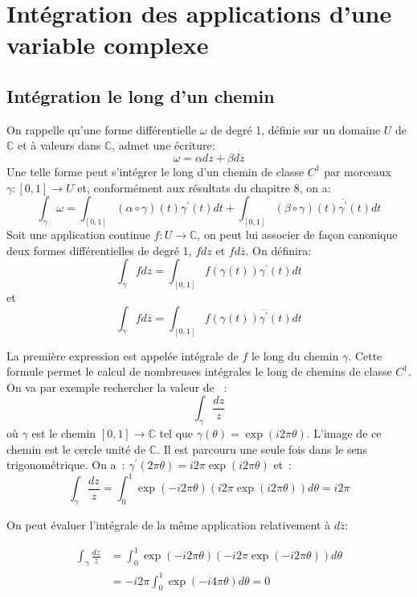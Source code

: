 \chapter{Intégration des applications d'une variable complexe}
\section{Intégration le long d'un chemin}
On rappelle qu'une forme différentielle $\omega$ de degré 1, définie sur un
domaine $U$ de $\mathbb{C}$ et à valeurs dans $\mathbb{C}$, admet une écriture:
\[
\omega=\alpha dz + \beta d\overline{z}
\]
Une telle forme peut s'intégrer le
long d'un chemin de classe $C^1$ par morceaux $\gamma \colon [0,1] \to U$ et, conformément aux résultats du chapitre 8, on a:
\[
\int_{\gamma} \omega = \int_{[0,1]}\left(\alpha \circ \gamma\right)(t)
\gamma^\prime(t)dt + \int_{[0,1]}\left(\beta \circ \gamma\right)(t)
\overline{\gamma^\prime}(t)dt
\]
Soit une application continue $f \colon U \to \mathbb{C}$, on peut lui associer
de façon canonique deux formes différentielles de degré 1, $fdz$ et 
$f d\overline{z}$. On définira:
\[
\int_{\gamma}f dz = \int_{[0,1]}f\left(\gamma(t)\right)\gamma^\prime(t)dt
\]
et 
\[
\int_{\gamma}f d\overline{z} =
\int_{[0,1]}f\left(\gamma(t)\right)\overline{\gamma^\prime}(t)dt
\]

La première expression est appelée intégrale de $f$ le long du chemin $\gamma$.
 Cette formule permet le calcul de nombreuses
intégrales le long de chemins de classe $C^1$. On va par exemple rechercher la
valeur de ~:
\[
\int_{\gamma} \frac{dz}{z}
\]
où $\gamma$ est le chemin $[0, 1] \to \mathbb{C}$ tel que
$\gamma(\theta) = \exp(i 2 \pi \theta)$. L'image de ce chemin est le cercle
unité de $\mathbb{C}$. Il est parcouru une seule fois dans le sens
trigonométrique. On a~: $\gamma^\prime(2 \pi \theta) = i 2 \pi \exp(i 2
\pi \theta)$ et~:
\[
\int_{\gamma} \frac{dz}{z} =  \int_0^1 \exp(-i 2 \pi \theta) (i 2 \pi \exp(i
2 \pi \theta)) d \theta = i 2 \pi 
\]

On peut évaluer l'intégrale de la même application relativement à
$d\overline{z}$:

\begin{align*}
\int_{\gamma} \frac{d\overline{z}}{z} & =  \int_0^1 \exp(-i 2 \pi \theta) (-i 2
\pi \exp(-i 2 \pi \theta)) d \theta  \\
&= -i 2 \pi \int_0^1 \exp(-i4 \pi \theta)
d \theta = 0
\end{align*}



